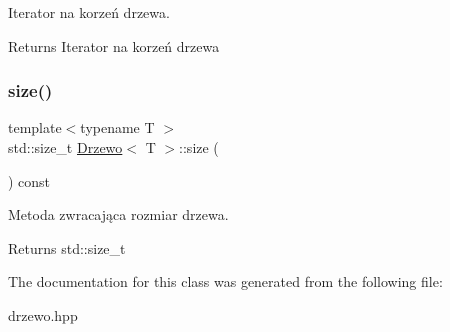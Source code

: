 Iterator na korzeń drzewa. \begin{DoxyReturn}{Returns}
Iterator na korzeń drzewa 
\end{DoxyReturn}
\mbox{\label{class_drzewo_a778ee17b16674b9d0577d22f5d55fa04}} 
\subsubsection{\texorpdfstring{size()}{size()}}
{\footnotesize\ttfamily template$<$typename T $>$ \\
std\+::size\+\_\+t \hyperlink{class_drzewo}{Drzewo}$<$ T $>$\+::size (\begin{DoxyParamCaption}{ }\end{DoxyParamCaption}) const\hspace{0.3cm}{\ttfamily [inline]}}

Metoda zwracająca rozmiar drzewa. \begin{DoxyReturn}{Returns}
std\+::size\+\_\+t 
\end{DoxyReturn}


The documentation for this class was generated from the following file\+:\begin{DoxyCompactItemize}
\item 
drzewo.\+hpp\end{DoxyCompactItemize}
